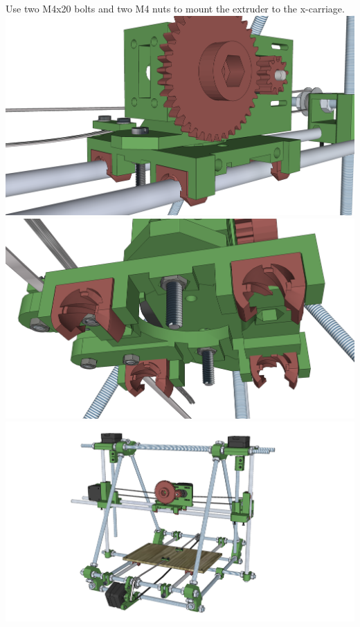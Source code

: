 \documentclass[twoside,a4paper,titlepage]{memoir}
\begin{document}
	\section{}
	Use two M4x20 bolts and two M4 nuts to mount the extruder to the x-carriage.\\
	\includegraphics[width=1\linewidth]{graphics/ch9_17_1.png}
	\includegraphics[width=1\linewidth]{graphics/ch9_17_2.png}
	\includegraphics[width=1\linewidth]{graphics/ch9_17_3.png}
	
\end{document}
